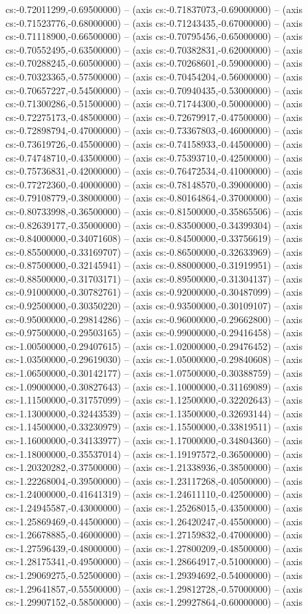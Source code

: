 cs:-0.72011299,-0.69500000) -- (axis cs:-0.71837073,-0.69000000) -- (axis cs:-0.71523776,-0.68000000) -- (axis cs:-0.71243435,-0.67000000) -- (axis cs:-0.71118900,-0.66500000) -- (axis cs:-0.70795456,-0.65000000) -- (axis cs:-0.70552495,-0.63500000) -- (axis cs:-0.70382831,-0.62000000) -- (axis cs:-0.70288245,-0.60500000) -- (axis cs:-0.70268601,-0.59000000) -- (axis cs:-0.70323365,-0.57500000) -- (axis cs:-0.70454204,-0.56000000) -- (axis cs:-0.70657227,-0.54500000) -- (axis cs:-0.70940435,-0.53000000) -- (axis cs:-0.71300286,-0.51500000) -- (axis cs:-0.71744300,-0.50000000) -- (axis cs:-0.72275173,-0.48500000) -- (axis cs:-0.72679917,-0.47500000) -- (axis cs:-0.72898794,-0.47000000) -- (axis cs:-0.73367803,-0.46000000) -- (axis cs:-0.73619726,-0.45500000) -- (axis cs:-0.74158933,-0.44500000) -- (axis cs:-0.74748710,-0.43500000) -- (axis cs:-0.75393710,-0.42500000) -- (axis cs:-0.75736831,-0.42000000) -- (axis cs:-0.76472534,-0.41000000) -- (axis cs:-0.77272360,-0.40000000) -- (axis cs:-0.78148570,-0.39000000) -- (axis cs:-0.79108779,-0.38000000) -- (axis cs:-0.80164864,-0.37000000) -- (axis cs:-0.80733998,-0.36500000) -- (axis cs:-0.81500000,-0.35865506) -- (axis cs:-0.82639177,-0.35000000) -- (axis cs:-0.83500000,-0.34399304) -- (axis cs:-0.84000000,-0.34071608) -- (axis cs:-0.84500000,-0.33756619) -- (axis cs:-0.85500000,-0.33169707) -- (axis cs:-0.86500000,-0.32633969) -- (axis cs:-0.87500000,-0.32145941) -- (axis cs:-0.88000000,-0.31919951) -- (axis cs:-0.88500000,-0.31703171) -- (axis cs:-0.89500000,-0.31304137) -- (axis cs:-0.91000000,-0.30782761) -- (axis cs:-0.92000000,-0.30487099) -- (axis cs:-0.92500000,-0.30350220) -- (axis cs:-0.93500000,-0.30109107) -- (axis cs:-0.95000000,-0.29814286) -- (axis cs:-0.96000000,-0.29662800) -- (axis cs:-0.97500000,-0.29503165) -- (axis cs:-0.99000000,-0.29416458) -- (axis cs:-1.00500000,-0.29407615) -- (axis cs:-1.02000000,-0.29476452) -- (axis cs:-1.03500000,-0.29619030) -- (axis cs:-1.05000000,-0.29840608) -- (axis cs:-1.06500000,-0.30142177) -- (axis cs:-1.07500000,-0.30388759) -- (axis cs:-1.09000000,-0.30827643) -- (axis cs:-1.10000000,-0.31169089) -- (axis cs:-1.11500000,-0.31757099) -- (axis cs:-1.12500000,-0.32202643) -- (axis cs:-1.13000000,-0.32443539) -- (axis cs:-1.13500000,-0.32693144) -- (axis cs:-1.14500000,-0.33230979) -- (axis cs:-1.15500000,-0.33819511) -- (axis cs:-1.16000000,-0.34133977) -- (axis cs:-1.17000000,-0.34804360) -- (axis cs:-1.18000000,-0.35537014) -- (axis cs:-1.19197572,-0.36500000) -- (axis cs:-1.20320282,-0.37500000) -- (axis cs:-1.21338936,-0.38500000) -- (axis cs:-1.22268004,-0.39500000) -- (axis cs:-1.23117268,-0.40500000) -- (axis cs:-1.24000000,-0.41641319) -- (axis cs:-1.24611110,-0.42500000) -- (axis cs:-1.24945587,-0.43000000) -- (axis cs:-1.25268015,-0.43500000) -- (axis cs:-1.25869469,-0.44500000) -- (axis cs:-1.26420247,-0.45500000) -- (axis cs:-1.26678885,-0.46000000) -- (axis cs:-1.27159832,-0.47000000) -- (axis cs:-1.27596439,-0.48000000) -- (axis cs:-1.27800209,-0.48500000) -- (axis cs:-1.28175341,-0.49500000) -- (axis cs:-1.28664917,-0.51000000) -- (axis cs:-1.29069275,-0.52500000) -- (axis cs:-1.29394692,-0.54000000) -- (axis cs:-1.29641857,-0.55500000) -- (axis cs:-1.29812728,-0.57000000) -- (axis cs:-1.29907152,-0.58500000) -- (axis cs:-1.29927864,-0.60000000) -- (axis 